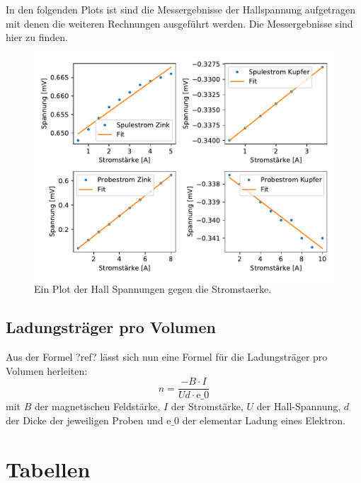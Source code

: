     In den folgenden Plots ist sind die Messergebnisse der Hallspannung aufgetragen mit denen die weiteren Rechnungen ausgeführt werden.
    Die Messergebnisse sind hier zu finden.
    \begin{figure}[H]
        \centering
        \includegraphics[width=1.1\textwidth]{build/Hall.pdf}
        \caption{Ein Plot der Hall Spannungen gegen die Stromstaerke.}
        \label{img:messHall}
    \end{figure}
    
    \subsection{Ladungsträger pro Volumen}

    Aus der Formel ?ref? lässt sich nun eine Formel für die Ladungsträger pro Volumen herleiten:
    \begin{equation}
        n = \frac{-B \cdot I}{Ud\cdot\text{e_0}}
    \end{equation}
    mit $B$ der magnetischen Feldstärke, $I$ der Stromstärke, $U$ der Hall-Spannung, $d$ der Dicke der jeweiligen Proben und $\text{e_0}$ der 
    elementar Ladung eines Elektron.
    \section{Tabellen}

